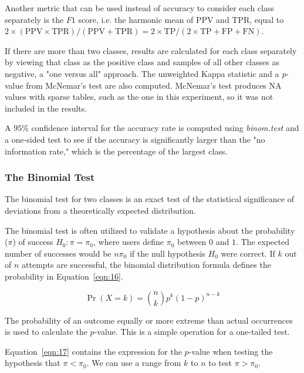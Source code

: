 \documentclass[sn-mathphys-num]{sn-jnl}%
\begin{document}
Another metric that can be used instead of accuracy to consider each class separately is the $F1$ score, i.e. the harmonic mean of PPV and TPR, equal to $2 \times (\mathrm{PPV} \times \mathrm{TPR}) / (\mathrm{PPV} + \mathrm{TPR}) = 2 \times \mathrm{TP} / (2 \times \mathrm{TP} + \mathrm{FP} + \mathrm{FN})$.

If there are more than two classes, results are calculated for each class separately by viewing that class as the positive class and samples of all other classes as negative, a "one versus all" approach.
The unweighted Kappa statistic and a \textit{p}-value from McNemar's test are also computed. McNemar's test produces NA values with sparse tables, such as the one in this experiment, so it was not included in the results.

A $95\%$ confidence interval for the accuracy rate is computed using \textit{binom.test} and a one-sided test \cite{binom.test2024, clopper1934use, conover1999practical, hollander2013nonparametric} to see if the accuracy is significantly larger than the "no information rate," which is the percentage of the largest class.

\subsubsection{The Binomial Test}

The binomial test \cite{howell1992statistical, graphpadGraphPadPrism} for two classes is an exact test of the statistical significance of deviations from a theoretically expected distribution.

The binomial test is often utilized to validate a hypothesis about the probability ($\pi$) of success 
$H_{0}\colon \pi =\pi_{0}$, where users define $\pi_{0}$ between $0$ and $1$. The expected number of successes would be $n\pi_{0}$ if the null hypothesis $H_{0}$ were correct. If $k$ out of $n$ attempts are successful, the binomial distribution formula defines the probability in Equation~\ref{eqn:16}.

\begin{equation}
	\Pr(X=k)={\binom{n}{k}}p^{k}(1-p)^{n-k}
	\label{eqn:16}
\end{equation}

The probability of an outcome equally or more extreme than actual occurrences is used to calculate the $p$-value. This is a simple operation for a one-tailed test. 

Equation~\ref{eqn:17} contains the expression for the $p$-value when testing the hypothesis that $\pi <\pi_{0}$. We can use a range from $k$ to $n$ to test $\pi >\pi_{0}$.
\end{document}
